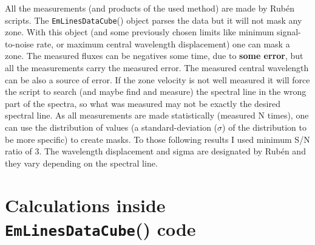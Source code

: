 \documentclass[a4paper,11pt]{article}
\begin{document}
All the measurements (and products of the used method) are made by Rub\'en scripts. The \texttt{EmLinesDataCube}() object parses the data but it will not mask any zone. With this object (and some previously chosen limits like minimum signal-to-noise rate, or maximum central wavelength displacement) one can mask a zone. The measured fluxes can be negatives some time, due to {\color{blue}\textbf{some error}}, but all the measurements carry the measured error. The measured central wavelength can be also a source of error. If the zone velocity is not well measured it will force the script to search (and maybe find and measure) the spectral line in the wrong part of the spectra, so what was measured may not be exactly the desired spectral line. As all measurements are made statistically (measured N times), one can use the distribution of values (a standard-deviation ($\sigma$) of the distribution to be more specific) to create masks. 
To those following results I used minimum S/N ratio of 3. The wavelength displacement and sigma are designated by Rub\'en and they vary depending on the spectral line.

%

%

\section{Calculations inside \texttt{EmLinesDataCube}() code}
\end{document}
